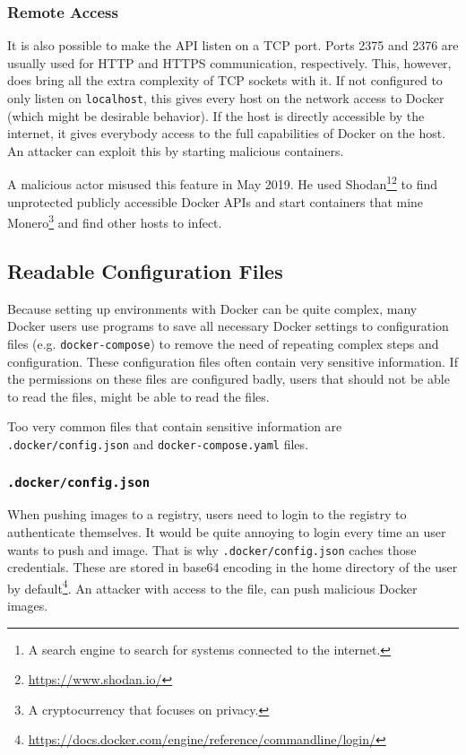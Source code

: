 \subsubsection{Remote Access}
It is also possible to make the API listen on a TCP port. Ports 2375 and 2376 are usually used for HTTP and HTTPS communication, respectively. This, however, does bring all the extra complexity of TCP sockets with it. If not configured to only listen on \lstinline{localhost}, this gives every host on the network access to Docker (which might be desirable behavior). If the host is directly accessible by the internet, it gives everybody access to the full capabilities of Docker on the host. An attacker can exploit this by starting malicious containers\cite{Metasploit-Unprotected-TCP-Socket}.

\hfill

A malicious actor misused this feature in May 2019. He used Shodan\footnote{A search engine to search for systems connected to the internet.}\footnote{\url{https://www.shodan.io/}} to find unprotected publicly accessible Docker APIs and start containers that mine Monero\footnote{A cryptocurrency that focuses on privacy.} and find other hosts to infect\cite{zoolu2-bot-1807}\cite{zoolu2-bot-1809}\cite{zoolu2-bot-1853}.

\subsection{Readable Configuration Files}
Because setting up environments with Docker can be quite complex, many Docker users use programs to save all necessary Docker settings to configuration files (e.g. \lstinline{docker-compose}) to remove the need of repeating complex steps and configuration. These configuration files often contain very sensitive information. If the permissions on these files are configured badly, users that should not be able to read the files, might be able to read the files.

Too very common files that contain sensitive information are \lstinline{.docker/config.json} and \lstinline{docker-compose.yaml} files.

\subsubsection{\texorpdfstring{\lstinline{.docker/config.json}}{.docker/config.json}}
When pushing images to a registry, users need to login to the registry to authenticate themselves.
It would be quite annoying to login every time an user wants to push and image. That is why \lstinline{.docker/config.json} caches those credentials. These are stored in base64 encoding in the home directory of the user by default\footnote{\url{https://docs.docker.com/engine/reference/commandline/login/}}. An attacker with access to the file, can push malicious Docker images\cite{Docker-Credentials-Metasploit}.

